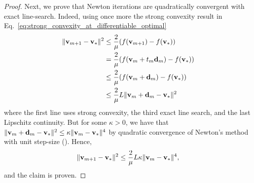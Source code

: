 \begin{theorem}
\begin{proof}
    Next, we prove that Newton iterations are quadratically convergent
  with exact line-search. Indeed, using once more the strong convexity result in Eq.~\eqref{eq:strong_convexity_at_differentiable_optimal}
  \begin{align*}
    \|{\mathbf{v}}_{m+1} - {\mathbf{v}}_*\|^2&\le \frac{2}{\mu} ( f({\mathbf{v}}_{m+1}) - f({\mathbf{v}}_*)) \\
                    &= \frac{2}{\mu} ( f({\mathbf{v}}_m + t_m {\mathbf{d}}_m   ) - f({\mathbf{v}}_*)) \\
                    &\le \frac{2}{\mu} ( f({\mathbf{v}}_m + {\mathbf{d}}_m   ) - f({\mathbf{v}}_*)) \\
                    &\le \frac{2}{\mu} L \|{\mathbf{v}}_m + {\mathbf{d}}_m - {\mathbf{v}}_*\|^2
  \end{align*}
    where the first line uses strong convexity,
    the third exact line search, and the last
    Lipschitz continuity. But for some $\kappa > 0$,
    we have that $\|{\mathbf{v}}_m + {\mathbf{d}}_m - {\mathbf{v}}_*\|^2 \le \kappa \|{\mathbf{v}}_{m} - {\mathbf{v}}_*\|^4$
    by quadratic convergence of Newton's method with unit step-size (\cite[Theorem 3.5]{bib:nocedal2006numerical}).
    Hence,
    \[
      \|{\mathbf{v}}_{m+1} - {\mathbf{v}}_*\|^2 \le \frac{2}{\mu}  L \kappa \|{\mathbf{v}}_{m} - {\mathbf{v}}_*\|^4,
    \]
    and the claim is proven.
  \end{proof}
\end{theorem}

